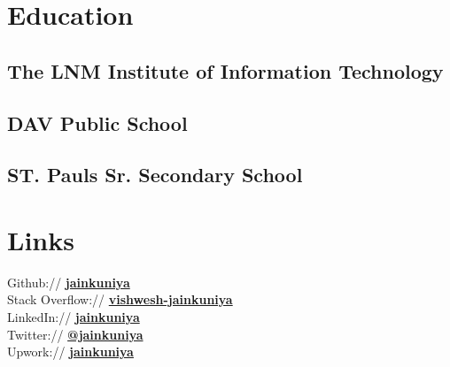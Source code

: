 \documentclass[letterpaper]{deedy-resume} %
\begin{document}
\begin{minipage}[t]{0.33\textwidth} %


\section{Education}

\subsection{The LNM Institute of Information Technology}


\sectionspace %

\subsection{DAV Public School}



\sectionspace %

\subsection{ST. Pauls Sr. Secondary School}


\sectionspace %


\section{Links}

Github:// \href{https://github.com/jainkuniya}{\bf jainkuniya} \\
Stack Overflow:// \href{https://stackoverflow.com/users/5612089/vishwesh-jainkuniya}{\bf vishwesh-jainkuniya} \\
LinkedIn:// \href{https://www.linkedin.com/in/jainkuniya}{\bf jainkuniya} \\
Twitter:// \href{https://twitter.com/jainkuniya}{\bf @jainkuniya} \\
Upwork:// \href{https://www.upwork.com/freelancers/~01841c33fc6a947c91}{\bf jainkuniya}


\end{minipage}
\end{document}
